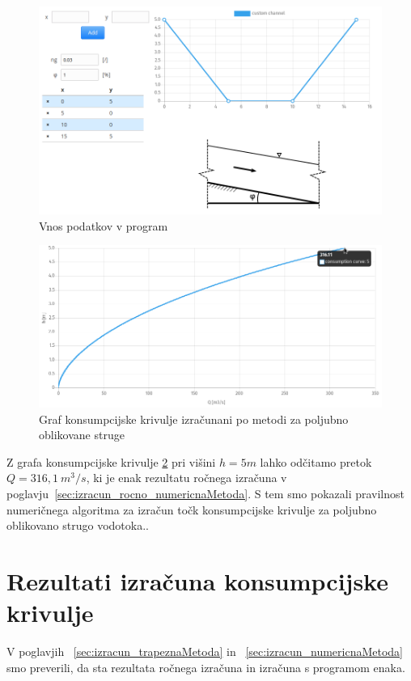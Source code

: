 \begin{figure}[H]
	\begin{centering}
		\includegraphics[width=\textwidth]{slike/izracuni/poljubna_struga.png}\caption{Vnos podatkov v program}\label{fig:modeliranjeStruge}
	\end{centering}
\end{figure}

\begin{figure}[H]
	\begin{centering}
		\includegraphics[width=\textwidth]{slike/izracuni/poljubna_konsumpcijska.png}\caption{Graf konsumpcijske krivulje izračunani po metodi za poljubno oblikovane struge}\label{fig:custom_konsumpcijskaKrivulja}
	\end{centering}
\end{figure}


Z grafa konsumpcijske krivulje \ref{fig:custom_konsumpcijskaKrivulja} pri višini $h = 5m$ lahko odčitamo pretok $Q=316,1~m^3/s$, ki je enak rezultatu ročnega izračuna v poglavju~\ref{sec:izracun_rocno_numericnaMetoda}. S tem smo pokazali pravilnost numeričnega algoritma za izračun točk konsumpcijske krivulje za poljubno oblikovano strugo vodotoka..




\section{Rezultati izračuna konsumpcijske krivulje} \label{sec:opis_rezultatIzracuna}
V poglavjih ~\ref{sec:izracun_trapeznaMetoda} in ~\ref{sec:izracun_numericnaMetoda} smo preverili, da sta rezultata ročnega izračuna in izračuna s programom enaka.


